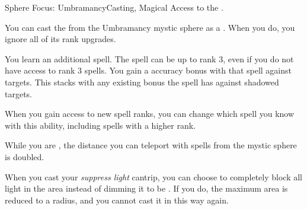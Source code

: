   \begin{magicalfeat}{Sphere Focus: Umbramancy}{Casting, Magical}
    \featpre Access to the  .

     You can cast the   from the Umbramancy mystic sphere as a .
    When you do, you ignore all of its rank upgrades.

     You learn an additional spell.
    The spell can be up to rank 3, even if you do not have access to rank 3 spells.
    You gain a  accuracy bonus with that spell against  targets.
    This stacks with any existing bonus the spell has against shadowed targets.

    When you gain access to new spell ranks, you can change which spell you know with this ability, including spells with a higher rank.

     While you are , the distance you can teleport with spells from the  mystic sphere is doubled.

     When you cast your \textit{suppress light} cantrip, you can choose to completely block all light in the area instead of dimming it to be .
    If you do, the maximum area is reduced to a \medarea radius, and you  cannot cast it in this way again.
  \end{magicalfeat}

